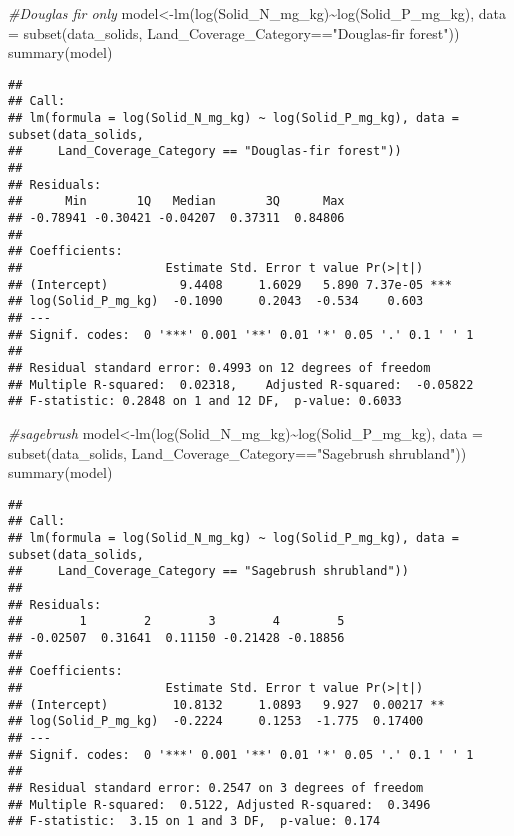 \documentclass[
]{article}
\newenvironment{Shaded}{\begin{snugshade}}{\end{snugshade}}
\newcommand{\AttributeTok}[1]{\textcolor[rgb]{0.77,0.63,0.00}{#1}}
\newcommand{\CommentTok}[1]{\textcolor[rgb]{0.56,0.35,0.01}{\textit{#1}}}
\newcommand{\FunctionTok}[1]{\textcolor[rgb]{0.00,0.00,0.00}{#1}}
\newcommand{\NormalTok}[1]{#1}
\newcommand{\OtherTok}[1]{\textcolor[rgb]{0.56,0.35,0.01}{#1}}
\newcommand{\SpecialCharTok}[1]{\textcolor[rgb]{0.00,0.00,0.00}{#1}}
\newcommand{\StringTok}[1]{\textcolor[rgb]{0.31,0.60,0.02}{#1}}
\begin{document}
\begin{Shaded}
\begin{Highlighting}[]
\CommentTok{\#Douglas fir only}
\NormalTok{model}\OtherTok{\textless{}{-}}\FunctionTok{lm}\NormalTok{(}\FunctionTok{log}\NormalTok{(Solid\_N\_mg\_kg)}\SpecialCharTok{\textasciitilde{}}\FunctionTok{log}\NormalTok{(Solid\_P\_mg\_kg), }\AttributeTok{data =} \FunctionTok{subset}\NormalTok{(data\_solids, Land\_Coverage\_Category}\SpecialCharTok{==}\StringTok{"Douglas{-}fir forest"}\NormalTok{))}
\FunctionTok{summary}\NormalTok{(model)}
\end{Highlighting}
\end{Shaded}

\begin{verbatim}
## 
## Call:
## lm(formula = log(Solid_N_mg_kg) ~ log(Solid_P_mg_kg), data = subset(data_solids, 
##     Land_Coverage_Category == "Douglas-fir forest"))
## 
## Residuals:
##      Min       1Q   Median       3Q      Max 
## -0.78941 -0.30421 -0.04207  0.37311  0.84806 
## 
## Coefficients:
##                    Estimate Std. Error t value Pr(>|t|)    
## (Intercept)          9.4408     1.6029   5.890 7.37e-05 ***
## log(Solid_P_mg_kg)  -0.1090     0.2043  -0.534    0.603    
## ---
## Signif. codes:  0 '***' 0.001 '**' 0.01 '*' 0.05 '.' 0.1 ' ' 1
## 
## Residual standard error: 0.4993 on 12 degrees of freedom
## Multiple R-squared:  0.02318,    Adjusted R-squared:  -0.05822 
## F-statistic: 0.2848 on 1 and 12 DF,  p-value: 0.6033
\end{verbatim}

\begin{Shaded}
\begin{Highlighting}[]
\CommentTok{\#sagebrush}
\NormalTok{model}\OtherTok{\textless{}{-}}\FunctionTok{lm}\NormalTok{(}\FunctionTok{log}\NormalTok{(Solid\_N\_mg\_kg)}\SpecialCharTok{\textasciitilde{}}\FunctionTok{log}\NormalTok{(Solid\_P\_mg\_kg), }\AttributeTok{data =} \FunctionTok{subset}\NormalTok{(data\_solids, Land\_Coverage\_Category}\SpecialCharTok{==}\StringTok{"Sagebrush shrubland"}\NormalTok{))}
\FunctionTok{summary}\NormalTok{(model)}
\end{Highlighting}
\end{Shaded}

\begin{verbatim}
## 
## Call:
## lm(formula = log(Solid_N_mg_kg) ~ log(Solid_P_mg_kg), data = subset(data_solids, 
##     Land_Coverage_Category == "Sagebrush shrubland"))
## 
## Residuals:
##        1        2        3        4        5 
## -0.02507  0.31641  0.11150 -0.21428 -0.18856 
## 
## Coefficients:
##                    Estimate Std. Error t value Pr(>|t|)   
## (Intercept)         10.8132     1.0893   9.927  0.00217 **
## log(Solid_P_mg_kg)  -0.2224     0.1253  -1.775  0.17400   
## ---
## Signif. codes:  0 '***' 0.001 '**' 0.01 '*' 0.05 '.' 0.1 ' ' 1
## 
## Residual standard error: 0.2547 on 3 degrees of freedom
## Multiple R-squared:  0.5122, Adjusted R-squared:  0.3496 
## F-statistic:  3.15 on 1 and 3 DF,  p-value: 0.174
\end{verbatim}
\end{document}
